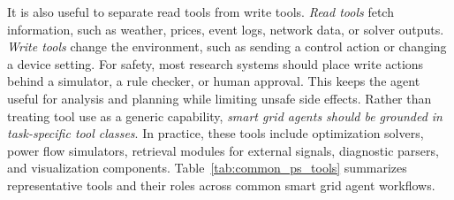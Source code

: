 \documentclass[journal,onecolumn]{IEEEtran} %
\begin{document}
It is also useful to separate read tools from write tools.\textit{ Read tools} fetch information, such as weather, prices, event logs, network data, or solver outputs. \textit{Write tools} change the environment, such as sending a control action or changing a device setting. For safety, most research systems should place write actions behind a simulator, a rule checker, or human approval. This keeps the agent useful for analysis and planning while limiting unsafe side effects.
Rather than treating tool use as a generic capability, \textit{smart grid agents should be grounded in task-specific tool classes}. In practice, these tools include optimization solvers, power flow simulators, retrieval modules for external signals, diagnostic parsers, and visualization components. Table~\ref{tab:common_ps_tools} summarizes representative tools and their roles across common smart grid agent workflows. 
\end{document}
